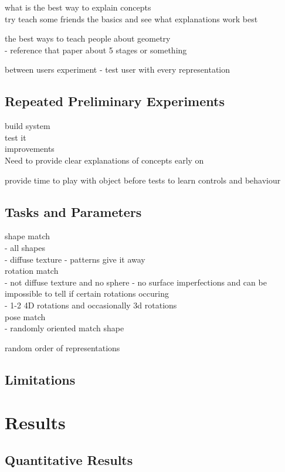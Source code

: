 \documentclass{l4proj}
\begin{document}
what is the best way to explain concepts\\
try teach some friends the basics and see what explanations work best

the best ways to teach people about geometry\\
 - reference that paper about 5 stages or something

between users experiment
 - test user with every representation

\subsection{Repeated Preliminary Experiments}

build system\\
test it\\
improvements\\

Need to provide clear explanations of concepts early on

provide time to play with object before tests to learn controls and behaviour

\subsection{Tasks and Parameters}

shape match\\
 - all shapes\\
 - diffuse texture - patterns give it away\\
rotation match\\
 - not diffuse texture and no sphere - no surface imperfections and can be impossible to tell if certain rotations occuring\\
 - 1-2 4D rotations and occasionally 3d rotations\\
pose match\\
 - randomly oriented match shape

random order of representations

\subsection{Limitations}

\section{Results}

\subsection{Quantitative Results}
\end{document}
